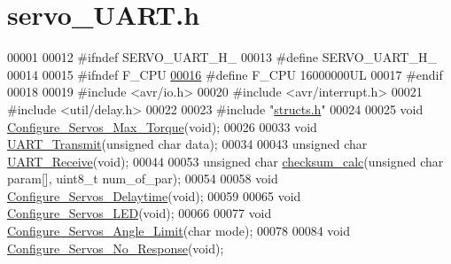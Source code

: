 \hypertarget{servo___u_a_r_t_8h_source}{}\section{servo\+\_\+\+U\+A\+R\+T.\+h}
\label{servo___u_a_r_t_8h_source}

\begin{DoxyCode}
00001 
00012 \textcolor{preprocessor}{#ifndef SERVO\_UART\_H\_}
00013 \textcolor{preprocessor}{#define SERVO\_UART\_H\_}
00014 
00015 \textcolor{preprocessor}{#ifndef F\_CPU}
\hypertarget{servo___u_a_r_t_8h_source.tex_l00016}{}\hyperlink{servo___u_a_r_t_8h_a43bafb28b29491ec7f871319b5a3b2f8}{00016} \textcolor{preprocessor}{#define F\_CPU 16000000UL    }
00017 \textcolor{preprocessor}{#endif}
00018 
00019 \textcolor{preprocessor}{#include <avr/io.h>}
00020 \textcolor{preprocessor}{#include <avr/interrupt.h>}
00021 \textcolor{preprocessor}{#include <util/delay.h>}
00022 
00023 \textcolor{preprocessor}{#include "\hyperlink{structs_8h}{structs.h}"}
00024 
00025 \textcolor{keywordtype}{void} \hyperlink{servo___u_a_r_t_8h_a2f788735cafd686c547c9340d905c3ad}{Configure\_Servos\_Max\_Torque}(\textcolor{keywordtype}{void});
00026 
00033 \textcolor{keywordtype}{void} \hyperlink{servo___u_a_r_t_8h_af34dbb08e8f6cfc1a58d9b7f2b81f455}{UART\_Transmit}(\textcolor{keywordtype}{unsigned} \textcolor{keywordtype}{char} data);
00034 
00043 \textcolor{keywordtype}{unsigned} \textcolor{keywordtype}{char} \hyperlink{servo___u_a_r_t_8h_a45145cd104fed6e8dff8dd62ee52ebe7}{UART\_Receive}(\textcolor{keywordtype}{void});
00044 
00053 \textcolor{keywordtype}{unsigned} \textcolor{keywordtype}{char} \hyperlink{servo___u_a_r_t_8h_a45e02356d032e2069888899bf1a987bf}{checksum\_calc}(\textcolor{keywordtype}{unsigned} \textcolor{keywordtype}{char} param[], uint8\_t num\_of\_par);
00054 
00058 \textcolor{keywordtype}{void} \hyperlink{servo___u_a_r_t_8h_a7522eb3c86cfa713aade9cbe082bcbba}{Configure\_Servos\_Delaytime}(\textcolor{keywordtype}{void});
00059 
00065 \textcolor{keywordtype}{void} \hyperlink{servo___u_a_r_t_8h_ae7bfd5ff29686df194ec9f4e310cf2e4}{Configure\_Servos\_LED}(\textcolor{keywordtype}{void});
00066 
00077 \textcolor{keywordtype}{void} \hyperlink{servo___u_a_r_t_8h_ac61953255036321acac8c2e20b76d692}{Configure\_Servos\_Angle\_Limit}(\textcolor{keywordtype}{char} mode);
00078 
00084 \textcolor{keywordtype}{void} \hyperlink{servo___u_a_r_t_8h_a17e89f3d8b4abe3abe352ffba8b684f1}{Configure\_Servos\_No\_Response}(\textcolor{keywordtype}{void});

\end{DoxyCode}
